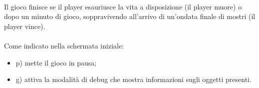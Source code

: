 \documentclass[a4paper,12pt]{report}
\begin{document}
\paragraph{}
Il gioco finisce se il player esauriusce la vita a disposizione (il player muore) o dopo un minuto di gioco, soppravivendo all'arrivo di un'ondata finale di mostri (il player vince).
\paragraph{}
Come indicato nella schermata iniziale:
\begin{itemize}
\item p) mette il gioco in pausa;
\item g) attiva la modalità di debug che mostra informazioni sugli oggetti presenti.
\end{itemize}


% 
% 
\end{document}
